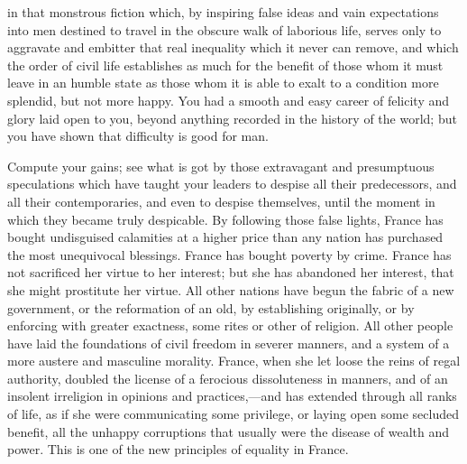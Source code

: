 in that monstrous fiction which, by inspiring false ideas and vain expectations into men destined to travel in the obscure walk of laborious life, serves only to aggravate and embitter that real inequality which it never can remove, and which the order of civil life establishes as much for the benefit of those whom it must leave in an humble state as those whom it is able to exalt to a condition more splendid, but not more happy. You had a smooth and easy career of felicity and glory laid open to you, beyond anything recorded in the history of the world; but you have shown that difficulty is good for man.

Compute your gains; see what is got by those extravagant and presumptuous speculations which have taught your leaders to despise all their predecessors, and all their contemporaries, and even to despise themselves, until the moment in which they became truly despicable. By following those false lights, France has bought undisguised calamities at a higher price than any nation has purchased the most unequivocal blessings. France has bought poverty by crime. France has not sacrificed her virtue to her interest; but she has abandoned her interest, that she might prostitute her virtue. All other nations have begun the fabric of a new government, or the reformation of an old, by establishing originally, or by enforcing with greater exactness, some rites or other of religion. All other people have laid the foundations of civil freedom in severer manners, and a system of a more austere and masculine morality. France, when she let loose the reins of regal authority, doubled the license of a ferocious dissoluteness in manners, and of an insolent irreligion in opinions and practices,—and has extended through all ranks of life, as if she were communicating some privilege, or laying open some secluded benefit, all the unhappy corruptions that usually were the disease of wealth and power. This is one of the new principles of equality in France.

